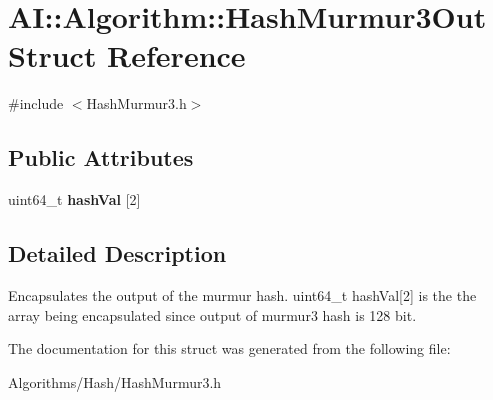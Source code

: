 \hypertarget{structAI_1_1Algorithm_1_1HashMurmur3Out}{\section{A\-I\-:\-:Algorithm\-:\-:Hash\-Murmur3\-Out Struct Reference}
\label{structAI_1_1Algorithm_1_1HashMurmur3Out}
}


{\ttfamily \#include $<$Hash\-Murmur3.\-h$>$}

\subsection*{Public Attributes}
\begin{DoxyCompactItemize}
\item 
\hypertarget{structAI_1_1Algorithm_1_1HashMurmur3Out_af8d364080521b9db8637dd7a623de06e}{uint64\-\_\-t {\bfseries hash\-Val} \mbox{[}2\mbox{]}}\label{structAI_1_1Algorithm_1_1HashMurmur3Out_af8d364080521b9db8637dd7a623de06e}

\end{DoxyCompactItemize}


\subsection{Detailed Description}
Encapsulates the output of the murmur hash. uint64\-\_\-t hash\-Val\mbox{[}2\mbox{]} is the the array being encapsulated since output of murmur3 hash is 128 bit. 

The documentation for this struct was generated from the following file\-:\begin{DoxyCompactItemize}
\item 
Algorithms/\-Hash/Hash\-Murmur3.\-h\end{DoxyCompactItemize}
